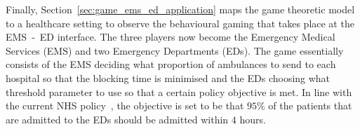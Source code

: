 Finally, Section~\ref{sec:game_ems_ed_application} maps the game theoretic
model to a healthcare setting to observe the behavioural gaming that takes place
at the EMS~-~ED interface.
The three players now become the Emergency Medical Services (EMS) and two
Emergency Departments (EDs).
The game essentially consists of the EMS deciding what proportion of
ambulances to send to each hospital so that the blocking time is minimised and
the EDs choosing what threshold parameter to use so that a certain policy
objective is met.
In line with the current NHS policy~\cite{fourhourtarget},
the objective is set to be that \(95\%\) of the patients that are admitted to
the EDs should be admitted within \(4\) hours.
